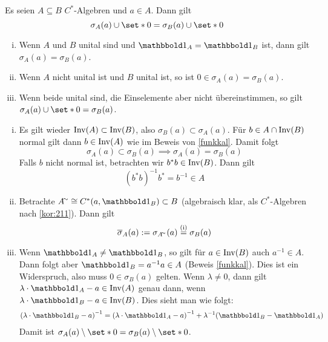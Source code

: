 \begin{korollar}[label=korr:220,{name=[Spektrum in C*-Unteralgebren]}]
	Es seien $A \subseteq B$  $C^*$-Algebren und $a \in A$. Dann gilt
	\[
		\sigma_A(a) \cup \set*{0} = \sigma_B(a) \cup \set*{0}
	\]
	\begin{enumerate}[(i),itemsep=0pt]
		\item Wenn $A$ und $B$ unital sind und $\ind_A=\ind_B$ ist, dann gilt $\sigma_A(a) = \sigma_B(a)$.
		\item Wenn $A$ nicht unital ist und $B$ unital ist, so ist $0 \in \sigma_A(a) = \sigma_B(a)$. 
		\item Wenn beide unital sind, die Einselemente aber nicht übereinstimmen, so gilt $\sigma_A(a) \cup \set*{0} = \sigma_B(a)$.
	\end{enumerate}
\end{korollar}
\begin{beweis} \leavevmode
	\begin{enumerate}[(i)]
		\item Es gilt wieder $\operatorname{Inv}(A) \subset \operatorname{Inv}(B)$, also $\sigma_B(a) \subset \sigma_A(a)$.
		Für $b \in A \cap \operatorname{Inv}(B)$ normal gilt dann $b \in \operatorname{Inv}(A)$ wie im Beweis von \autoref{funkkal}. Damit folgt
		\[
			\sigma_A(a) \subset \sigma_B(a) \implies \sigma_A(a) = \sigma_B(a)
		\]
		Falls $b$ nicht normal ist, betrachten wir $b^*b \in \operatorname{Inv}(B)$. Dann gilt
		\[
			(b^*b)^{-1} b^* = b^{-1} \in A
		\]
		\item Betrachte $A^\simm \cong C^*(a,\ind_B) \subset B$ (algebraisch klar, als $C^*$-Algebren nach \autoref{kor:211}). Dann gilt
		\[
			\overline{\sigma}_A(a) := \sigma_{A^\simm}(a) \StackText{(i)}{=}\sigma_B(a)
		\]
		\item Wenn $\ind_A \neq \ind_B$, so gilt für $a \in \operatorname{Inv}(B)$ auch $a^{-1}\in A$. 
		Dann folgt aber $\ind_B = a^{-1}a\in A$ (Beweis \ref{funkkal}). 
		Dies ist ein Widerspruch, also muss $0 \in \sigma_B(a)$ gelten. 
		Wenn $\lambda \neq 0$, dann gilt $\lambda \cdot \ind_A - a \in \Inv(A)$ genau dann, wenn $\lambda \cdot \ind_B -a \in \Inv(B)$. 
		Dies sieht man wie folgt:
		\begin{align}
			\enbrace*{\lambda \cdot \ind_B- a}^{-1} = \enbrace*{\lambda \cdot \ind_A -a}^{-1} + \lambda^{-1}\enbrace*{\ind_B-\ind_A}
		\end{align}
		Damit ist $\sigma_A(a) \setminus \set*{0} = \sigma_B(a) \setminus \set*{0}$. \qedhere
	\end{enumerate}
\end{beweis}
\newpage

